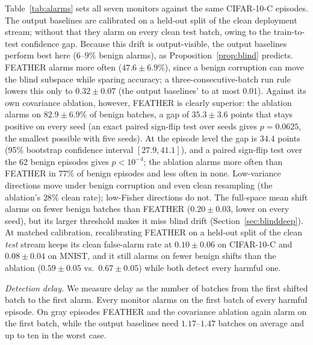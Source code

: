 \documentclass[conference]{IEEEtran}
\begin{document}
Table~\ref{tab:alarms} sets all seven monitors against the same CIFAR-10-C
episodes. The output baselines are calibrated on a held-out split of the clean
deployment stream; without that they alarm on every clean test batch, owing to
the train-to-test confidence gap. Because this drift is output-visible, the
output baselines perform best here ($6$--$9\%$ benign alarms), as
Proposition~\ref{prop:blind} predicts. FEATHER alarms more often
($47.6 \pm 6.9\%$), since a benign corruption can move the blind subspace while
sparing accuracy; a three-consecutive-batch run rule lowers this only to
$0.32 \pm 0.07$ (the output baselines' to at most $0.01$). Against its own
covariance ablation, however, FEATHER is clearly superior: the ablation alarms
on $82.9 \pm 6.9\%$ of benign batches, a gap of $35.3 \pm 3.6$ points that
stays positive on every seed (an exact paired sign-flip test over seeds gives
$p = 0.0625$, the smallest possible with five seeds). At the episode level the
gap is $34.4$ points (95\% bootstrap confidence interval $[27.9, 41.1]$), and a
paired sign-flip test over the 62 benign episodes gives $p < 10^{-4}$; the
ablation alarms more often than FEATHER in $77\%$ of benign episodes and less
often in none. Low-variance directions
move under benign corruption and even clean resampling (the ablation's $28\%$
clean rate); low-Fisher directions do not. The full-space mean shift alarms on
fewer benign batches than FEATHER ($0.20 \pm 0.03$, lower on every seed), but
its larger threshold makes it miss blind drift (Section~\ref{sec:blinddeep}).
At matched calibration, recalibrating FEATHER on a held-out split of the clean
\emph{test} stream keeps its clean false-alarm rate at $0.10 \pm 0.06$ on
CIFAR-10-C and $0.08 \pm 0.04$ on MNIST, and it still alarms on fewer benign
shifts than the ablation ($0.59 \pm 0.05$ vs.\ $0.67 \pm 0.05$) while both
detect every harmful one.

\textit{Detection delay.} We measure delay as the number of batches from the
first shifted batch to the first alarm. Every monitor alarms on the first
batch of every harmful episode. On gray episodes FEATHER and the covariance
ablation again alarm on the first batch, while the output baselines need
$1.17$--$1.47$ batches on average and up to ten in the worst case.
\end{document}
